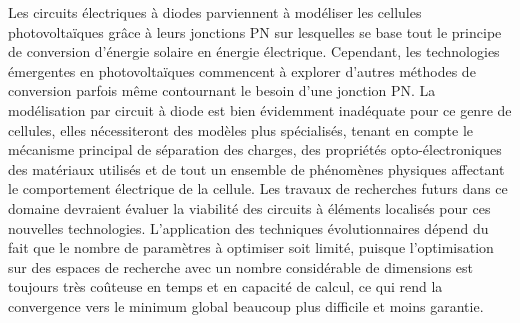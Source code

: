 Les circuits électriques à diodes parviennent à modéliser les cellules photovoltaïques grâce à leurs jonctions PN sur lesquelles se base tout le principe de conversion d'énergie solaire en énergie électrique. Cependant, les technologies émergentes en photovoltaïques commencent à explorer d'autres méthodes de conversion parfois même contournant le besoin d'une jonction PN. La modélisation par circuit à diode est bien évidemment inadéquate pour ce genre de cellules, elles nécessiteront des modèles plus spécialisés, tenant en compte le mécanisme principal de séparation des charges, des propriétés opto-électroniques des matériaux utilisés et de tout un ensemble de phénomènes physiques affectant le comportement électrique de la cellule. Les travaux de recherches futurs dans ce domaine devraient évaluer la viabilité des circuits à éléments localisés pour ces nouvelles technologies. L'application des techniques évolutionnaires dépend du fait que le nombre de paramètres à optimiser soit limité, puisque l'optimisation sur des espaces de recherche avec un nombre considérable de dimensions est toujours très coûteuse en temps et en capacité de calcul, ce qui rend la convergence vers le minimum global beaucoup plus difficile et moins garantie.


